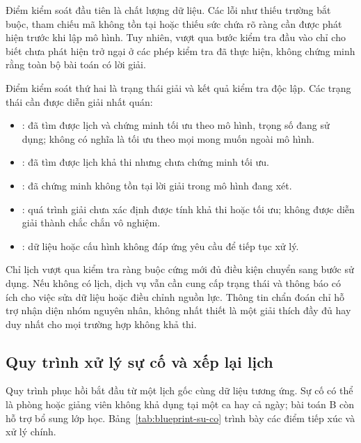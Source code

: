 Điểm kiểm soát đầu tiên là chất lượng dữ liệu. Các lỗi như thiếu trường bắt buộc, tham chiếu mã không tồn tại hoặc thiếu sức chứa rõ ràng cần được phát hiện trước khi lập mô hình. Tuy nhiên, vượt qua bước kiểm tra đầu vào chỉ cho biết chưa phát hiện trở ngại ở các phép kiểm tra đã thực hiện, không chứng minh rằng toàn bộ bài toán có lời giải.

Điểm kiểm soát thứ hai là trạng thái giải và kết quả kiểm tra độc lập. Các trạng thái cần được diễn giải nhất quán:
\begin{itemize}
    \item {}: đã tìm được lịch và chứng minh tối ưu theo mô hình, trọng số đang sử dụng; không có nghĩa là tối ưu theo mọi mong muốn ngoài mô hình.
    \item {}: đã tìm được lịch khả thi nhưng chưa chứng minh tối ưu.
    \item {}: đã chứng minh không tồn tại lời giải trong mô hình đang xét.
    \item {}: quá trình giải chưa xác định được tính khả thi hoặc tối ưu; không được diễn giải thành chắc chắn vô nghiệm.
    \item {}: dữ liệu hoặc cấu hình không đáp ứng yêu cầu để tiếp tục xử lý.
\end{itemize}

Chỉ lịch vượt qua kiểm tra ràng buộc cứng mới đủ điều kiện chuyển sang bước sử dụng. Nếu không có lịch, dịch vụ vẫn cần cung cấp trạng thái và thông báo có ích cho việc sửa dữ liệu hoặc điều chỉnh nguồn lực. Thông tin chẩn đoán chỉ hỗ trợ nhận diện nhóm nguyên nhân, không nhất thiết là một giải thích đầy đủ hay duy nhất cho mọi trường hợp không khả thi.

\subsection{Quy trình xử lý sự cố và xếp lại lịch}
\label{subsec:blueprint-su-co}

Quy trình phục hồi bắt đầu từ một lịch gốc cùng dữ liệu tương ứng. Sự cố có thể là phòng hoặc giảng viên không khả dụng tại một ca hay cả ngày; bài toán B còn hỗ trợ bổ sung lớp học. Bảng~\ref{tab:blueprint-su-co} trình bày các điểm tiếp xúc và xử lý chính.

